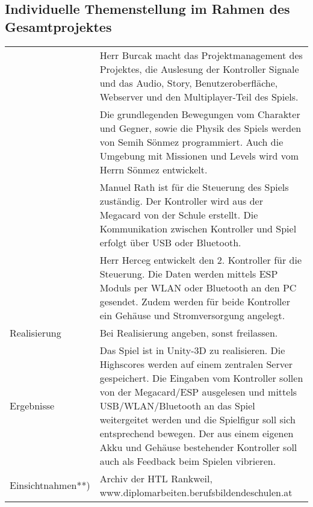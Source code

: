 \subsection *{Individuelle Themenstellung im Rahmen des Gesamtprojektes}
\begin{tabular}{@{}p{5cm}p{8cm}}

	\emplA & 	Herr Burcak macht das Projektmanagement des Projektes, die Auslesung der Kontroller Signale und das Audio, Story, Benutzeroberfläche, Webserver und den Multiplayer-Teil des Spiels.  \\
		
	\emplB & 	Die grundlegenden Bewegungen vom Charakter und Gegner, sowie die Physik des Spiels werden von Semih Sönmez programmiert. Auch die Umgebung mit Missionen und Levels wird vom Herrn Sönmez entwickelt.  \\
		
	\emplC & 	 
	
	Manuel Rath ist für die Steuerung des Spiels zuständig. Der Kontroller wird aus der Megacard von der Schule erstellt. Die Kommunikation zwischen Kontroller und Spiel erfolgt über USB oder Bluetooth.  \\

	\emplD & 	Herr Herceg entwickelt den 2. Kontroller für die Steuerung. Die Daten werden mittels ESP Moduls per WLAN oder Bluetooth an den PC gesendet. Zudem werden für beide Kontroller ein Gehäuse und Stromversorgung angelegt.  \\

Realisierung & Bei Realisierung angeben, sonst freilassen.  \\

Ergebnisse & Das Spiel ist in Unity-3D zu realisieren. Die Highscores werden auf einem zentralen Server gespeichert. Die Eingaben vom Kontroller sollen von der Megacard/ESP ausgelesen und mittels USB/WLAN/Bluetooth an das Spiel weitergeitet werden und die Spielfigur soll sich entsprechend bewegen. Der aus einem eigenen Akku und Gehäuse bestehender Kontroller soll auch als Feedback beim Spielen vibrieren.   \\

Einsichtnahmen**) & Archiv der HTL Rankweil, \newline www.diplomarbeiten.berufsbildendeschulen.at \\
\end{tabular}
